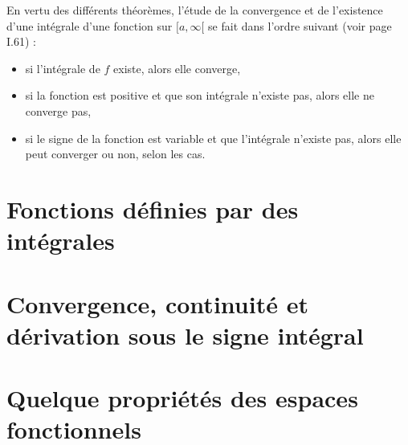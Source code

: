 En vertu des différents théorèmes, l'étude de la convergence et de l'existence d'une intégrale d'une fonction sur $[a,\infty[$ se fait dans l'ordre suivant (voir page I.61) :
\begin{itemize}
\item si l'intégrale de $f$ existe, alors elle converge,
\item si la fonction est positive et que son intégrale n'existe pas, alors elle ne converge pas,
\item si le signe de la fonction est variable et que l'intégrale n'existe pas, alors elle peut converger ou non, selon les cas.
\end{itemize}

	
					\section{Fonctions définies par des intégrales}




					\section{Convergence, continuité et dérivation sous le signe intégral}

					\section{Quelque propriétés des espaces fonctionnels}


